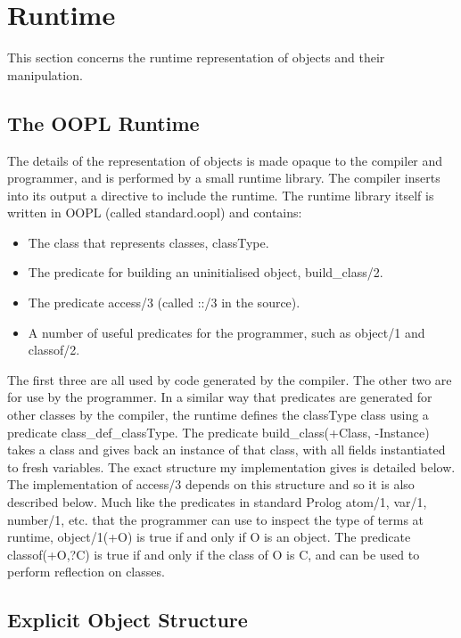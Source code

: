 \documentclass[12pt,a4paper,twoside,openright]{report}
\begin{document}
\section{Runtime}

This section concerns the runtime representation of objects and their manipulation.

	\subsection{The OOPL Runtime}

The details of the representation of objects is made opaque to the compiler and programmer, and is performed by a small runtime library. The compiler inserts into its output a directive to include the runtime. The runtime library itself is written in OOPL (called standard.oopl) and contains:

\begin{itemize}
	\item The class that represents classes, classType.
	\item The predicate for building an uninitialised object, build_class/2.
	\item The predicate access/3 (called ::/3 in the source).
	\item A number of useful predicates for the programmer, such as object/1 and classof/2.
\end{itemize}

The first three are all used by code generated by the compiler. The other two are for use by the programmer. In a similar way that predicates are generated for other classes by the compiler, the runtime defines the classType class using a predicate class_def_classType. The predicate build_class(+Class, -Instance) takes a class and gives back an instance of that class, with all fields instantiated to fresh variables. The exact structure my implementation gives is detailed below. The implementation of access/3 depends on this structure and so it is also described below. Much like the predicates in standard Prolog atom/1, var/1, number/1, etc. that the programmer can use to inspect the type of terms at runtime, object/1(+O) is true if and only if O is an object. The predicate classof(+O,?C) is true if and only if the class of O is C, and can be used to perform reflection on classes.

	\subsection{Explicit Object Structure}
	
\end{document}
